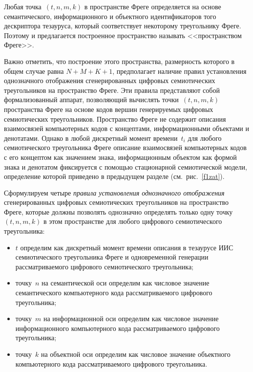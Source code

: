 \begin{multicols}{2}
   Любая точка~$(t, n, m, k)$ в пространстве Фреге определяется на основе семантического, 
информационного и объектного идентификаторов того дескриптора тезауруса, который 
соответствует некоторому треугольнику Фреге. Поэтому и предлагается построенное 
пространство называть <<пространством Фреге>>.
   
   Важно отметить, что построение этого пространства, размерность которого в общем 
случае равна $N + M +K+ 1$, предполагает наличие правил установления однозначного 
отображения сгенерированных цифровых семиотических треугольников на пространство 
Фреге. Эти правила представляют собой формализованный аппарат, позволяющий 
вычислять точки~$(t, n, m, k)$ пространства Фреге на основе кодов вершин генерируемых 
цифровых семиотических треугольников. Пространство Фреге не содержит описания 
взаимосвязей компьютерных кодов с концептами, информационными объектами и 
денотатами. Однако в любой дискретный момент времени~$t_i$ для любого семиотического 
треугольника Фреге описание взаимосвязей компьютерных кодов с его концептом как 
значением знака, информационным объектом как формой знака и денотатом фиксируется с 
помощью стационарной семиотической модели, определение которой приведено в 
предыдущем разделе (см.\ рис.~\ref{f1zat}).
   
   Сформулируем четыре \textit{правила установления однозначного отображения} 
сгенерированных цифровых семиотических треугольников на пространство Фреге, которые 
должны позволять однозначно определять только одну точку~$(t, n, m, k)$ в этом 
пространстве для любого цифрового семиотического треугольника:
   \begin{itemize}
\item $t$ определим как дискретный момент времени описания в тезаурусе ИИС 
семиотического треугольника Фреге и одновременной генерации 
рассматриваемого цифрового семиотического треугольника;
\item точку~$n$ на семантической оси определим как числовое значение 
семантического компьютерного кода рассматриваемого цифрового треугольника;
\item точку~$m$ на информационной оси определим как числовое значение 
информационного компьютерного кода рассматриваемого цифрового 
треугольника;
\item точку~$k$ на объектной оси определим как числовое значение объектного 
компьютерного кода рассматриваемого цифрового треугольника.
\end{itemize}


\end{multicols}
